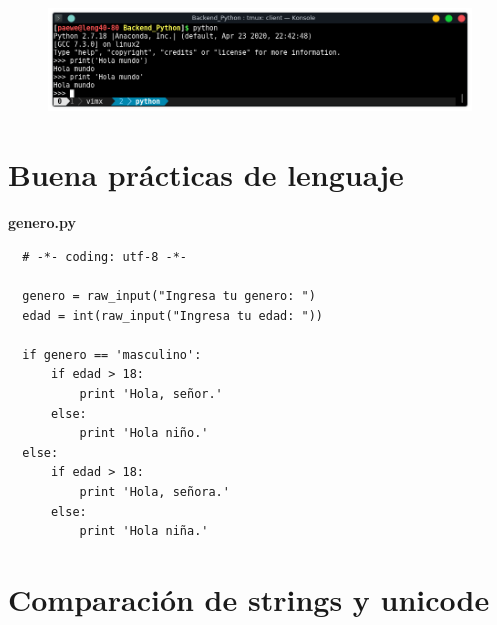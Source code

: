 \documentclass{article}
\begin{document}
\begin{figure}[h!]
  \centering
  \includegraphics[scale=0.75]{./Pictures/005_hola_mundo_python2.png}
\end{figure}














































\section{Buena prácticas de lenguaje}%

\textbf{genero.py}
\begin{verbatim}
  # -*- coding: utf-8 -*-

  genero = raw_input("Ingresa tu genero: ")
  edad = int(raw_input("Ingresa tu edad: "))

  if genero == 'masculino':
      if edad > 18:
          print 'Hola, señor.'
      else:
          print 'Hola niño.'
  else:
      if edad > 18:
          print 'Hola, señora.'
      else:
          print 'Hola niña.'
\end{verbatim}


\section{Comparación de strings y unicode}%
\end{document}
